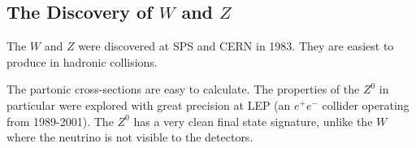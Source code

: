 \subsection{The Discovery of $W$ and $Z$}
%
The $W$ and $Z$ were discovered at SPS and CERN in 1983. They are easiest to produce in hadronic collisions.
\begin{figure}[!h]
  \centering
  \hfill
\end{figure}
The partonic cross-sections are easy to calculate. The properties of the $Z^0$ in particular were explored with great precision at LEP (an $e^+ e^-$ collider operating from 1989-2001). The $Z^0$ has a very clean final state signature, unlike the $W$ where the neutrino is not visible to the detectors. 
